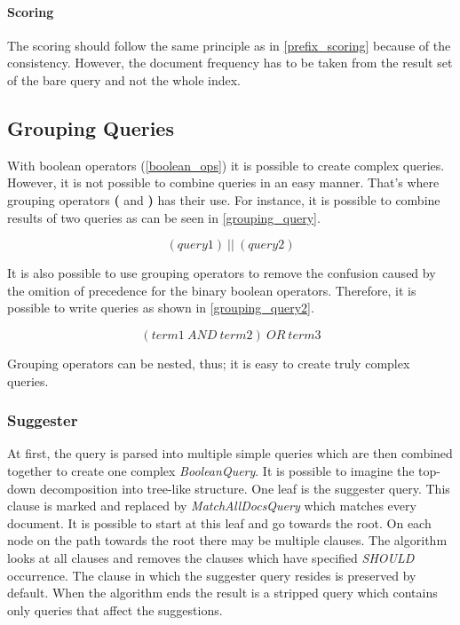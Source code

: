 \paragraph{Scoring}
The scoring should follow the same principle as in \ref{prefix_scoring} because of the consistency. However,
the document frequency has to be taken from the result set of the bare query and not the whole index.

\subsection{Grouping Queries}
\label{grouping_queries}
With boolean operators (\ref{boolean_ops}) it is possible to create complex queries. However, it is not possible to
combine queries in an easy manner. That's where grouping operators \textbf{(} and \textbf{)} has their use. For instance,
it is possible to combine results of two queries as can be seen in \ref{grouping_query}.

\begin{equation}
\label{grouping_query}
(query1)\ \vert\vert\ (query2)
\end{equation}

It is also possible to use grouping operators to remove the confusion caused by the omition of precedence for the binary
boolean operators. Therefore, it is possible to write queries as shown in \ref{grouping_query2}.

\begin{equation}
\label{grouping_query2}
(term1\ AND\ term2)\ OR\ term3
\end{equation}

Grouping operators can be nested, thus; it is easy to create truly complex queries.

\subsubsection{Suggester}

At first, the query is parsed into multiple simple queries which are then combined together to create one complex
\textit{BooleanQuery}. It is possible to imagine the top-down decomposition into tree-like structure. %
One leaf is the suggester query. This clause is marked and replaced by \textit{MatchAllDocsQuery} which matches every
document. %
It is possible to start at this leaf and go towards the root. On each node on the path towards the root there may be
multiple clauses. The algorithm looks at all clauses and removes the clauses which have specified \textit{SHOULD}
occurrence. The clause in which the suggester query resides is preserved by default. When the algorithm ends the result
is a stripped query which contains only queries that affect the suggestions.

